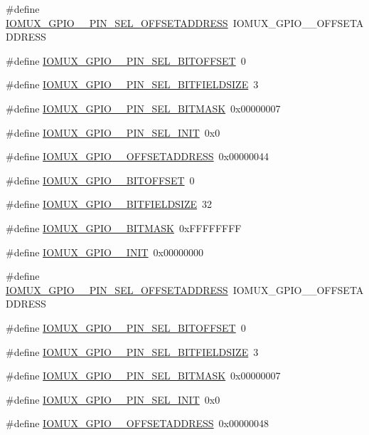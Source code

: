 \begin{DoxyCompactItemize}
\item 
\#define \hyperlink{a00560_a8f202ff03d9d07d392c15713f15f70e7}{IOMUX\_\-GPIO\_\_\-PIN\_\-SEL\_\-OFFSETADDRESS}~IOMUX\_\-GPIO\_\_\-OFFSETADDRESS
\item 
\#define \hyperlink{a00560_a2b64e3540e2bc9e1d0a06f5e88eb7a86}{IOMUX\_\-GPIO\_\_\-PIN\_\-SEL\_\-BITOFFSET}~0
\item 
\#define \hyperlink{a00560_ac82c436570ae40a47d0d9fbb49d0926b}{IOMUX\_\-GPIO\_\_\-PIN\_\-SEL\_\-BITFIELDSIZE}~3
\item 
\#define \hyperlink{a00560_aba84f1cd62ad9570f5e1603fdaa1599a}{IOMUX\_\-GPIO\_\_\-PIN\_\-SEL\_\-BITMASK}~0x00000007
\item 
\#define \hyperlink{a00560_a2cf03776f16b7fa788390dab43acb69c}{IOMUX\_\-GPIO\_\_\-PIN\_\-SEL\_\-INIT}~0x0
\item 
\#define \hyperlink{a00560_a6fbcbe6520b37847e8d15816eb4a6809}{IOMUX\_\-GPIO\_\_\-OFFSETADDRESS}~0x00000044
\item 
\#define \hyperlink{a00560_adaf0c3d8edea83dc03f95b253f25c5b1}{IOMUX\_\-GPIO\_\_\-BITOFFSET}~0
\item 
\#define \hyperlink{a00560_a02a2dc107fcef58f2935208571a7c541}{IOMUX\_\-GPIO\_\_\-BITFIELDSIZE}~32
\item 
\#define \hyperlink{a00560_acf8503daae29f69668f37c09b6c3fd58}{IOMUX\_\-GPIO\_\_\-BITMASK}~0xFFFFFFFF
\item 
\#define \hyperlink{a00560_a9fc2e92b61722fe75372a06fd987bca6}{IOMUX\_\-GPIO\_\_\-INIT}~0x00000000
\item 
\#define \hyperlink{a00560_a646f574fc163cc78ee62a609b8190a14}{IOMUX\_\-GPIO\_\_\-PIN\_\-SEL\_\-OFFSETADDRESS}~IOMUX\_\-GPIO\_\_\-OFFSETADDRESS
\item 
\#define \hyperlink{a00560_a0549bb533028ae09ab737282de8eebfd}{IOMUX\_\-GPIO\_\_\-PIN\_\-SEL\_\-BITOFFSET}~0
\item 
\#define \hyperlink{a00560_a8e286e953a3f2b4facbc5b9e94f14766}{IOMUX\_\-GPIO\_\_\-PIN\_\-SEL\_\-BITFIELDSIZE}~3
\item 
\#define \hyperlink{a00560_aa7515e0958d9318085af7b77588629c1}{IOMUX\_\-GPIO\_\_\-PIN\_\-SEL\_\-BITMASK}~0x00000007
\item 
\#define \hyperlink{a00560_a4531f3c79ff58f2694f78e95e35f7cc0}{IOMUX\_\-GPIO\_\_\-PIN\_\-SEL\_\-INIT}~0x0
\item 
\#define \hyperlink{a00560_a00f8d7bd84d0b9b772610de18724a64f}{IOMUX\_\-GPIO\_\_\-OFFSETADDRESS}~0x00000048
\item 

\end{DoxyCompactItemize}
